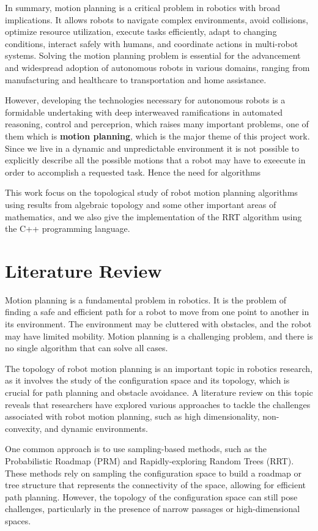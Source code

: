 In summary, motion planning is a critical problem in robotics with broad implications. It allows robots to navigate complex environments, avoid collisions, optimize resource utilization, execute tasks efficiently, adapt to changing conditions, interact safely with humans, and coordinate actions in multi-robot systems. Solving the motion planning problem is essential for the advancement and widespread adoption of autonomous robots in various domains, ranging from manufacturing and healthcare to transportation and home assistance.

However, developing the technologies necessary for autonomous robots is a formidable undertaking with deep interweaved ramifications in automated reasoning, control and perceprion, which raises many important problems, one of them which is \textbf{motion planning}, which is the major theme of this project work. Since we live in a dynamic and unpredictable environment it is not possible to explicitly describe all the possible motions that a robot may have to exeecute in order to accomplish a requested task. Hence the need for algorithms

This work focus on the topological study of robot motion planning algorithms using results from algebraic topology and some other important areas of mathematics, and we also give the implementation of the RRT algorithm using the C++ programming language.

\section{Literature Review}
Motion planning is a fundamental problem in robotics. It is the problem of finding a safe and efficient path for a robot to move from one point to another in its environment. The environment may be cluttered with obstacles, and the robot may have limited mobility. Motion planning is a challenging problem, and there is no single algorithm that can solve all cases.

The topology of robot motion planning is an important topic in robotics research, as it involves the study of the configuration space and its topology, which is crucial for path planning and obstacle avoidance. A literature review on this topic reveals that researchers have explored various approaches to tackle the challenges associated with robot motion planning, such as high dimensionality, non-convexity, and dynamic environments.

One common approach is to use sampling-based methods, such as the Probabilistic Roadmap (PRM) and Rapidly-exploring Random Trees (RRT). These methods rely on sampling the configuration space to build a roadmap or tree structure that represents the connectivity of the space, allowing for efficient path planning. However, the topology of the configuration space can still pose challenges, particularly in the presence of narrow passages or high-dimensional spaces.

